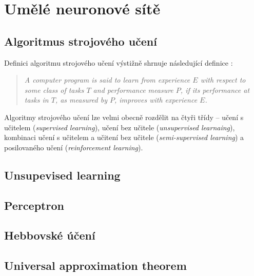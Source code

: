 \section{Umělé neuronové sítě}
\subsection{Algoritmus strojového učení}
\label{sec:machine_learning}
Definici algoritmu strojového učení výstižně shrnuje následující definice \cite[str. 2]{Mitchell1997}:
\blockquote{\emph{A computer program is said to learn from experience $E$ with respect to some class of tasks $T$ and performance measure $P$, if its performance at tasks in $T$, as measured by $P$, improves with experience $E$.}}

Algoritmy strojového učení lze velmi obecně rozdělit na čtyři třídy – učení s učitelem (\emph{supervised learning}),
učení bez učitele (\emph{unsupervised learnaing}), kombinaci učení s učitelem a učitení bez učitele (\emph{semi-supervised learning}) a posilovaného učení (\emph{reinforcement learning}).
\subsection{Unsupevised learning}
\subsection{Perceptron}
\subsection{Hebbovské účení}
\subsection{Universal approximation theorem}
\label{sec:universal_approximation_theorem}

